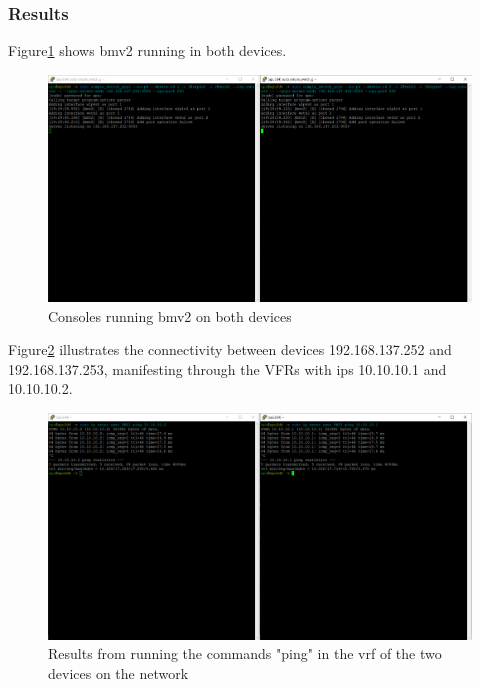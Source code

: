 \subsubsection{Results}


Figure\ref{fig:exp2_phase2_bmv2} shows \gls{bmv2} running in both devices.

\begin{figure}
	\centering
	\includegraphics[width=\textwidth]{Chapters/Figures/tests/bmv2_phase_2/bmv2_running.PNG}
	\caption{Consoles running \gls{bmv2} on both devices}
	\label{fig:exp2_phase2_bmv2}
\end{figure}

Figure\ref{fig:exp2_phase2_pings} illustrates the connectivity between devices 192.168.137.252 and 192.168.137.253, manifesting through the VFRs with \glspl{ip} 10.10.10.1 and 10.10.10.2.

\begin{figure}
	\centering
	\includegraphics[width=\textwidth]{Chapters/Figures/tests/bmv2_phase_2/pings.PNG}
	\caption{Results from running the commands "ping" in the \gls{vrf} of the two devices on the network}
	\label{fig:exp2_phase2_pings}
\end{figure}

